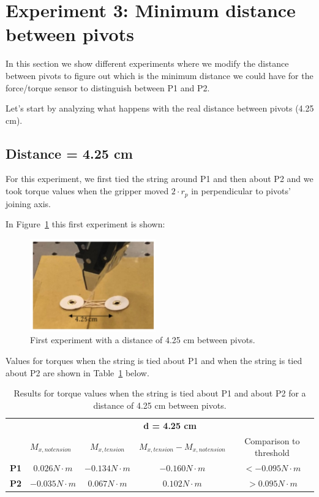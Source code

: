 \section{Experiment 3: Minimum distance between pivots}
In this section we show different experiments where we modify the distance between pivots to figure out which is the minimum distance we could have for the force/torque sensor to distinguish between P1 and P2.

Let's start by analyzing what happens with the real distance between pivots (4.25 cm).

\subsection{Distance = 4.25 cm}
For this experiment, we first tied the string around P1 and then about P2 and we took torque values when the gripper moved $2 \cdot r_{p}$ in perpendicular to pivots' joining axis.

In Figure~\ref{fig:distance1} this first experiment is shown:
\begin{figure}[h!]
	\centering
	\includegraphics[height=40mm]{chapters/figures/experiments/exp3_distance1.jpg}
	\caption{First experiment with a distance of 4.25 cm between pivots.}
	\label{fig:distance1}
\end{figure}

Values for torques when the string is tied about P1 and when the string is tied about P2 are shown in Table~\ref{tab:distance1} below.
\begin{table}[htbp]
	\centering
	\begin{tabular}{|l|c|c|c|c|}
		\cmidrule{2-5}    \multicolumn{1}{r|}{} & \multicolumn{4}{c|}{\textbf{d = 4.25 cm}} \\
		\cmidrule{2-5}    \multicolumn{1}{r|}{} & \multicolumn{1}{l|}{\textbf{$M_{x, no tension}$}} & \textbf{$M_{x, tension}$} & \textbf{$M_{x, tension} - M_{x, no tension}$} & Comparison to threshold \\
		\midrule
		\textbf{P1} & $0.026 N \cdot m$ & $-0.134 N \cdot m$ & $-0.160 N \cdot m$ & $< -0.095 N \cdot m$ \\
		\midrule
		\textbf{P2} & $-0.035 N \cdot m$ & $0.067 N \cdot m$ & $0.102 N \cdot m$ & $> 0.095 N \cdot m$ \\
		\bottomrule
	\end{tabular}%
	\caption{Results for torque values when the string is tied about P1 and about P2 for a distance of 4.25 cm between pivots.}
	\label{tab:distance1}%
\end{table}%

